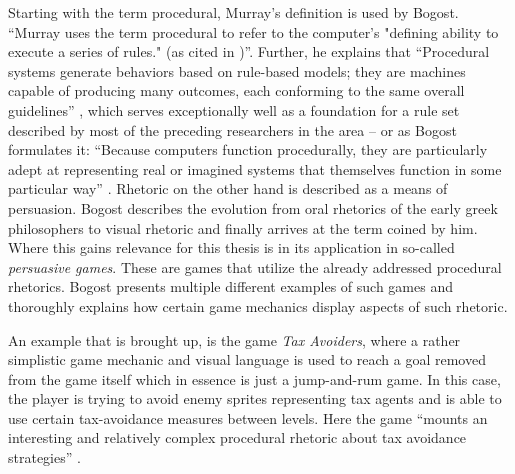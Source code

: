 Starting with the term procedural, Murray's definition is used by Bogost. \enquote{Murray uses the term procedural to refer to the computer’s "defining ability to execute a series of rules." (as cited in \cite[p. 4]{bogost2007persuasive})}. Further, he explains that \enquote{Procedural systems generate behaviors based on rule-based models; they are machines capable of producing many outcomes, each conforming to the same overall guidelines} \cite[p. 4]{bogost2007persuasive}, which serves exceptionally well as a foundation for a rule set described by most of the preceding researchers in the area -- or as Bogost formulates it: \enquote{Because computers function procedurally, they are particularly adept at representing real or imagined systems that themselves function in some particular way} \cite[p. 5]{bogost2007persuasive}. Rhetoric on the other hand is described as a means of persuasion. Bogost describes the evolution from oral rhetorics of the early greek philosophers to visual rhetoric and finally arrives at the term coined by him. Where this gains relevance for this thesis is in its application in so-called \textit{persuasive games}. These are games that utilize the already addressed procedural rhetorics. Bogost presents multiple different examples of such games \cite[p. 46-53]{bogost2007persuasive} and thoroughly explains how certain game mechanics display aspects of such rhetoric.

An example that is brought up, is the game \textit{Tax Avoiders}, where a rather simplistic game mechanic and visual language is used to reach a goal removed from the game itself which in essence is just a jump-and-rum game. In this case, the player is trying to avoid enemy sprites representing tax agents and is able to use certain tax-avoidance measures between levels. Here the game \enquote{mounts an interesting and relatively complex procedural rhetoric about tax avoidance strategies} \cite[p. 52]{bogost2007persuasive}.

